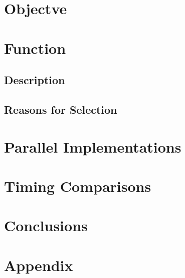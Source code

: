 \documentclass[12pt]{report}
\begin{document}
\raggedright{



\newpage

\section{Objectve}

\section{Function}

\subsection{Description}

\subsection{Reasons for Selection}

\section{Parallel Implementations}

%



%

\section{Timing Comparisons}

\section{Conclusions}




\newpage

\appendix
\section{Appendix}



}
\end{document}
